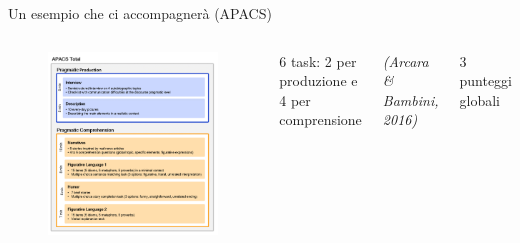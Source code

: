 \documentclass[
  ignorenonframetext,
]{beamer}
\begin{document}
\begin{frame}{Un esempio che ci accompagnerà (APACS)}
\label{un-esempio-che-ci-accompagneruxe0-apacs}
\begin{columns}

\begin{figure}
\includegraphics[width=\textwidth]{Figures/APACS_test.png}
\end{figure}

6 task: 2 per produzione e 4 per comprensione

\emph{(Arcara \& Bambini, 2016)}

3 punteggi globali

\end{columns}
\end{frame}
\end{document}
